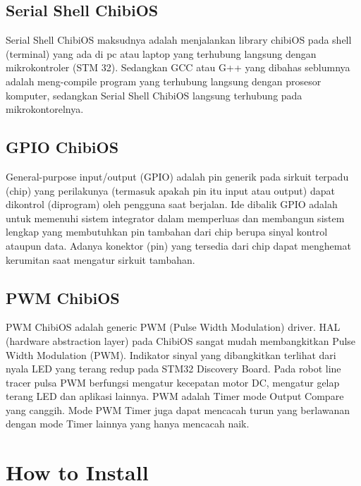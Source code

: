 \documentclass[11pt,fleqn]{book} %
\begin{document}
\section{Serial Shell ChibiOS }
\hspace{10pt}Serial Shell ChibiOS maksudnya adalah menjalankan library chibiOS pada shell (terminal) yang ada di pc atau laptop yang terhubung langsung dengan mikrokontroler (STM 32). 
Sedangkan  GCC atau G++ yang dibahas seblumnya adalah meng-compile program yang terhubung langsung dengan prosesor komputer, 
sedangkan Serial Shell ChibiOS langsung terhubung pada mikrokontorelnya.
\section{GPIO ChibiOS}
\hspace{10pt}General-purpose input/output (GPIO) adalah pin generik pada sirkuit terpadu (chip) yang perilakunya (termasuk apakah pin itu input atau output) dapat dikontrol (diprogram) oleh pengguna saat berjalan. Ide dibalik GPIO adalah untuk memenuhi sistem integrator dalam memperluas dan membangun sistem lengkap yang membutuhkan pin tambahan dari chip berupa sinyal kontrol ataupun data. 
Adanya konektor (pin) yang tersedia dari chip dapat menghemat kerumitan saat mengatur sirkuit tambahan.
\section{PWM ChibiOS}

\hspace{10pt}PWM ChibiOS adalah generic PWM (Pulse Width Modulation) driver.
HAL (hardware abstraction layer) pada ChibiOS sangat mudah membangkitkan Pulse Width Modulation (PWM).
Indikator sinyal yang dibangkitkan terlihat dari nyala LED yang terang redup pada STM32 Discovery Board.
Pada robot line tracer pulsa PWM berfungsi mengatur kecepatan motor DC, mengatur gelap terang LED dan aplikasi lainnya. 
PWM adalah Timer mode Output Compare yang canggih. 
Mode PWM Timer juga dapat mencacah turun yang berlawanan dengan mode Timer lainnya yang hanya mencacah naik.\\
\chapter{How to Install}
\end{document}
